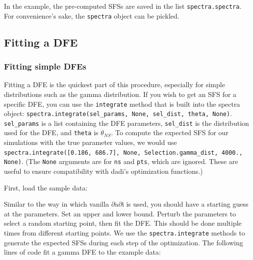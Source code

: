 \documentclass[12pt]{article}
\newcommand{\dadi}{dadi\xspace}
\begin{document}
In the example, the pre-computed SFSs are saved in the list \texttt{spectra.spectra}. For convenience's sake, the \texttt{spectra} object can be pickled.




\subsection{Fitting a DFE}

\subsubsection{Fitting simple DFEs}

Fitting a DFE is the quickest part of this procedure, especially for simple distributions such as the gamma distribution. If you wish to get an SFS for a specific DFE, you can use the \texttt{integrate} method that is built into the spectra object: \texttt{spectra.integrate(sel\_params, None, sel\_dist, theta, None)}. \texttt{sel\_params} is a list containing the DFE parameters, \texttt{sel\_dist} is the distribution used for the DFE, and \texttt{theta} is $\theta_{NS}$. To compute the expected SFS for our simulations with the true parameter values, we would use \texttt{spectra.integrate([0.186, 686.7], None, Selection.gamma\_dist, 4000., None)}. (The \texttt{None} arguments are for \texttt{ns} and \texttt{pts}, which are ignored. These are useful to ensure compatibility with \dadi's optimization functions.)

First, load the sample data:



Similar to the way in which vanilla $\partial$a$\partial$i is used, you should have a starting guess at the parameters. Set an upper and lower bound. Perturb the parameters to select a random starting point, then fit the DFE. This should be done multiple times from different starting points. We use the \texttt{spectra.integrate} methods to generate the expected SFSs during each step of the optimization. The following lines of code fit a gamma DFE to the example data:


\end{document}
